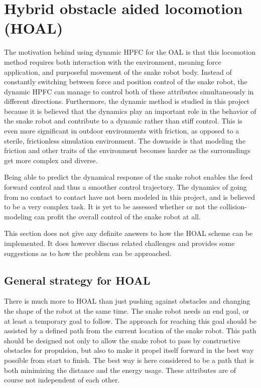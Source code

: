\section{Hybrid obstacle aided locomotion (HOAL)}\label{sec:dhpfc-oal}

The motivation behind using dynamic HPFC for the OAL is that this locomotion method requires both interaction with the environment, meaning force application, and purposeful movement of the snake robot body. Instead of constantly switching between force and position control of the snake robot, the dynamic HPFC can manage to control both of these attributes simultaneously in different directions. Furthermore, the dynamic method is studied in this project because it is believed that the dynamics play an important role in the behavior of the snake robot and contribute to a dynamic rather than stiff control. This is even more significant in outdoor environments with friction, as opposed to a sterile, frictionless simulation environment. The downside is that modeling the friction and other traits of the environment becomes harder as the surroundings get more complex and diverse.

Being able to predict the dynamical response of the snake robot enables the feed forward control and thus a smoother control trajectory. 
The dynamics of going from no contact to contact have not been modeled in this project, and is believed to be a very complex task. It is yet to be assessed whether or not the collision-modeling can profit the overall control of the snake robot at all.

This section does not give any definite answers to how the HOAL scheme can be implemented. It does however discuss related challenges and provides some suggestions as to how the problem can be approached.

\subsection{General strategy for HOAL}

There is much more to HOAL than just pushing against obstacles and changing the shape of the robot at the same time. The snake robot needs an end goal, or at least a temporary goal to follow. The approach for reaching this goal should be assisted by a defined path from the current location of the snake robot. This path should be designed not only to allow the snake robot to pass by constructive obstacles for propulsion, but also to make it propel itself forward in the best way possible from start to finish. The best way is here considered to be a path that is both minimizing the distance and the energy usage. These attributes are of course not independent of each other.

